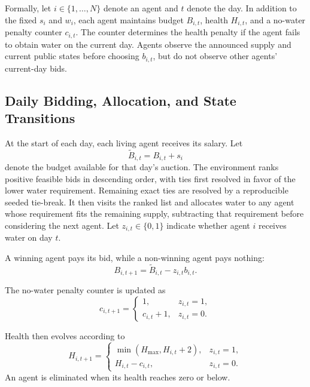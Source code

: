 \documentclass[letterpaper]{article} %
\begin{document}
Formally, let $i \in \{1,\ldots,N\}$ denote an agent and $t$ denote the
day. In addition to the fixed $s_i$ and $w_i$, each agent maintains budget
$B_{i,t}$, health $H_{i,t}$, and a no-water penalty counter $c_{i,t}$. The
counter determines the health penalty if the agent fails to obtain water
on the current day. Agents observe the announced supply and current public
states before choosing $b_{i,t}$, but do not observe other agents'
current-day bids.

\subsection{Daily Bidding, Allocation, and State Transitions}

At the start of each day, each living agent receives its
salary. Let
\begin{equation}
    \widetilde{B}_{i,t}=B_{i,t}+s_i
\end{equation}
denote the budget available for that day's auction.
The environment ranks positive feasible bids in descending order, with
ties first resolved in favor of the lower water requirement. Remaining
exact ties are resolved by a reproducible seeded tie-break. It then visits
the ranked list and allocates water to any agent whose requirement fits the
remaining supply, subtracting that requirement before considering the next
agent. Let $z_{i,t}\in\{0,1\}$ indicate whether agent $i$ receives water
on day $t$.

A winning agent pays its bid, while a non-winning agent pays
nothing:
\begin{equation}
    B_{i,t+1}
    =
    \widetilde{B}_{i,t}-z_{i,t}b_{i,t}.
\end{equation}

The no-water penalty counter is updated as
\begin{equation}
    c_{i,t+1}
    =
    \begin{cases}
        1, & z_{i,t}=1,\\
        c_{i,t}+1, & z_{i,t}=0.
    \end{cases}
\end{equation}

Health then evolves according to
\begin{equation}
    H_{i,t+1}
    =
    \begin{cases}
        \min(H_{\max},H_{i,t}+2), & z_{i,t}=1,\\
        H_{i,t}-c_{i,t}, & z_{i,t}=0.
    \end{cases}
\end{equation}
An agent is eliminated when its health reaches zero or below.
\end{document}

